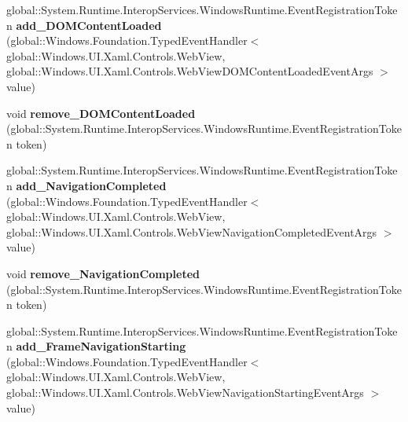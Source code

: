 \begin{DoxyCompactItemize}
\item 
\mbox{\label{class_windows_1_1_u_i_1_1_xaml_1_1_controls_1_1_web_view_a5d6440eae6015ec132e5aa0d3b751b5f}} 
global\+::\+System.\+Runtime.\+Interop\+Services.\+Windows\+Runtime.\+Event\+Registration\+Token {\bfseries add\+\_\+\+D\+O\+M\+Content\+Loaded} (global\+::\+Windows.\+Foundation.\+Typed\+Event\+Handler$<$ global\+::\+Windows.\+U\+I.\+Xaml.\+Controls.\+Web\+View, global\+::\+Windows.\+U\+I.\+Xaml.\+Controls.\+Web\+View\+D\+O\+M\+Content\+Loaded\+Event\+Args $>$ value)
\item 
\mbox{\label{class_windows_1_1_u_i_1_1_xaml_1_1_controls_1_1_web_view_a596a722f4d6a0b2c3a141febd26a7e0c}} 
void {\bfseries remove\+\_\+\+D\+O\+M\+Content\+Loaded} (global\+::\+System.\+Runtime.\+Interop\+Services.\+Windows\+Runtime.\+Event\+Registration\+Token token)
\item 
\mbox{\label{class_windows_1_1_u_i_1_1_xaml_1_1_controls_1_1_web_view_a59c21d9d632dd5968f5ea16c8da3ab20}} 
global\+::\+System.\+Runtime.\+Interop\+Services.\+Windows\+Runtime.\+Event\+Registration\+Token {\bfseries add\+\_\+\+Navigation\+Completed} (global\+::\+Windows.\+Foundation.\+Typed\+Event\+Handler$<$ global\+::\+Windows.\+U\+I.\+Xaml.\+Controls.\+Web\+View, global\+::\+Windows.\+U\+I.\+Xaml.\+Controls.\+Web\+View\+Navigation\+Completed\+Event\+Args $>$ value)
\item 
\mbox{\label{class_windows_1_1_u_i_1_1_xaml_1_1_controls_1_1_web_view_a17436d2219b831aeaac455abd0126294}} 
void {\bfseries remove\+\_\+\+Navigation\+Completed} (global\+::\+System.\+Runtime.\+Interop\+Services.\+Windows\+Runtime.\+Event\+Registration\+Token token)
\item 
\mbox{\label{class_windows_1_1_u_i_1_1_xaml_1_1_controls_1_1_web_view_addb2e6ae0e6b5b9acd50a349f6206712}} 
global\+::\+System.\+Runtime.\+Interop\+Services.\+Windows\+Runtime.\+Event\+Registration\+Token {\bfseries add\+\_\+\+Frame\+Navigation\+Starting} (global\+::\+Windows.\+Foundation.\+Typed\+Event\+Handler$<$ global\+::\+Windows.\+U\+I.\+Xaml.\+Controls.\+Web\+View, global\+::\+Windows.\+U\+I.\+Xaml.\+Controls.\+Web\+View\+Navigation\+Starting\+Event\+Args $>$ value)

\end{DoxyCompactItemize}
